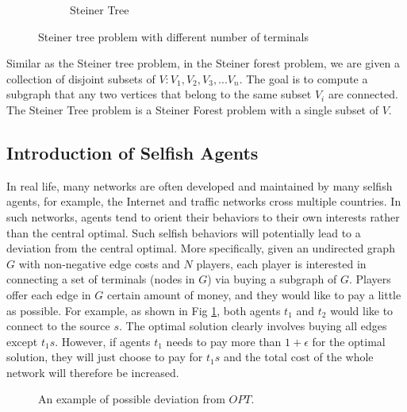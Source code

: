 \documentclass[11pt,psfig,times]{article}
\begin{document}
\begin{figure}[H]
\begin{center}
\begin{subfigure}[b]{0.25\textwidth}
			\caption{Steiner Tree}
		\end{subfigure}
		\caption{Steiner tree problem with different number of terminals}
	\end{center}
\end{figure}

Similar as the Steiner tree problem, in the Steiner forest problem, we are given a collection of disjoint subsets of \(V: V_1,V_2,V_3,...V_n\). The goal is to compute a subgraph that any two vertices that belong to the same subset \(V_i\) are connected. The Steiner Tree problem is a Steiner Forest problem with a single subset of \(V\).  

\subsection{Introduction of Selfish Agents}
In real life, many networks are often developed and maintained by many selfish agents, for example, the Internet and traffic networks cross multiple countries. In such networks, agents tend to orient their behaviors to their own interests rather than the central optimal. Such selfish behaviors will potentially lead to a deviation from the central optimal. More specifically, given an undirected graph \(G\) with non-negative edge costs and \(N\) players, each player is interested in connecting a set of terminals (nodes in \(G\)) via buying a subgraph of \(G\). Players offer each edge in \(G\) certain amount of money, and they would like to pay a little as possible. For example, as shown in Fig \ref{fig:deviation}, both agents $t_1$ and $t_2$ would like to connect to the source $s$. The optimal solution clearly involves buying all edges except $t_1s$. However, if agents $t_1$ needs to pay more than $1+\epsilon$ for the optimal solution, they will just choose to pay for $t_1s$ and the total cost of the whole network will therefore be increased.

\begin{figure}[H]
	\begin{center}
	\end{center}
	\caption{An example of possible deviation from $OPT$.}
	\label{fig:deviation}
\end{figure}
\end{document}
